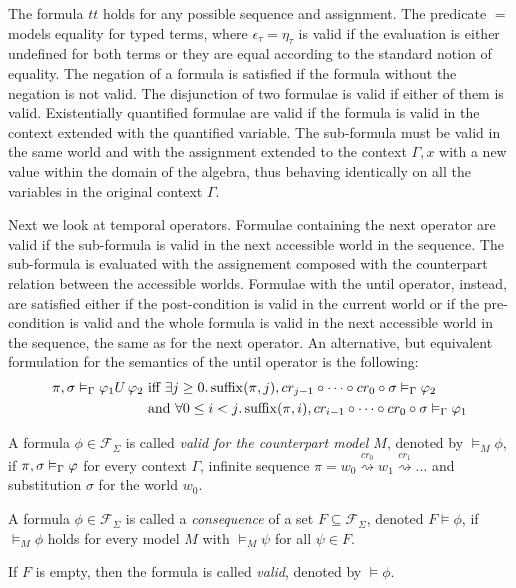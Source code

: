 The formula $tt$ holds for any possible sequence and assignment. The predicate $=$ models equality for typed terms, where
$\epsilon_\tau = \eta_\tau$ is valid if the evaluation is either undefined for both terms or they are equal according to
the standard notion of equality. The negation of a formula is satisfied if the formula without the negation is not
valid. The disjunction of two formulae is valid if either of them is valid. Existentially quantified formulae are valid
if the formula is valid in the context extended with the quantified variable. The sub-formula must be valid in the same
world and with the assignment extended to the context $\Gamma, x$ with a new value within the domain of the algebra,
thus behaving identically on all the variables in the original context $\Gamma$.

Next we look at temporal operators.
Formulae containing the next operator are valid if the sub-formula is valid in the next accessible world in the sequence.
The sub-formula is evaluated with the assignement composed with the counterpart relation between the accessible worlds.
Formulae with the until operator, instead, are satisfied either if the post-condition is valid in the current world or 
if the pre-condition is valid and the whole formula is valid in the next accessible world in the sequence, the same as
for the next operator. An alternative, but equivalent formulation for the semantics of the until operator is the following:
\begin{align*}
  \pi, \sigma \vDash_\Gamma {\varphi_1}U\,{\varphi_2}
      &\text{ iff } \exists {j \geq 0} \ldotp {{\operatorname{suffix}(\pi,j)}, {cr_{j-1} \circ \cdots \circ cr_0 \circ \sigma} \vDash_{\Gamma} {\varphi_2}} \\
      &\text{ and } \forall {0 \leq i < j} \ldotp {{\operatorname{suffix}(\pi,i)}, {cr_{i-1} \circ \cdots \circ cr_0 \circ \sigma} \vDash_{\Gamma} {\varphi_1}}
\end{align*}

\begin{definition}\label{eq:validmodel}
  A formula $\phi \in \mathcal{F}_\Sigma$ is called \emph{valid for the counterpart model $M$}, denoted by $\vDash_M
  \phi$, if ${\pi}, {\sigma} \vDash_{\Gamma} {\varphi}$ for every context $\Gamma$, infinite sequence $\pi = w_0 \overset{cr_0}{\rightsquigarrow} w_1 \overset{cr_1}{\rightsquigarrow} \ldots$ and substitution $\sigma$ for the world $w_0$.
\end{definition}
\begin{definition}\label{eq:valid}
  A formula $\phi \in \mathcal{F}_\Sigma$ is called a \emph{consequence} of a set $F \subseteq \mathcal{F}_\Sigma$,
  denoted $F \vDash \phi$, if $\vDash_M \phi$ holds for every model $M$ with $\vDash_M \psi$ for all $\psi \in F$.

  If $F$ is empty, then the formula is called \emph{valid}, denoted by $\vDash \phi$.
\end{definition}

